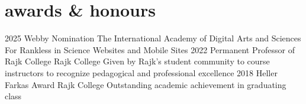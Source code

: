 \documentclass[]{friggeri-cv}
\begin{document}
\section{awards \& honours}
\begin{entrylist}
  \entry
  {2025}
  {Webby Nomination}
  {The International Academy of Digital Arts and Sciences}
  {For Rankless in Science Websites and Mobile Sites}
  \entry
  {2022}
  {Permanent Professor of Rajk College}
  {Rajk College}
  {Given by Rajk's student community to course instructors to recognize pedagogical and professional excellence}
  \entry
  {2018}
  {Heller Farkas Award}
  {Rajk College}
  {Outstanding academic achievement in graduating class}
\end{entrylist}
\end{document}
